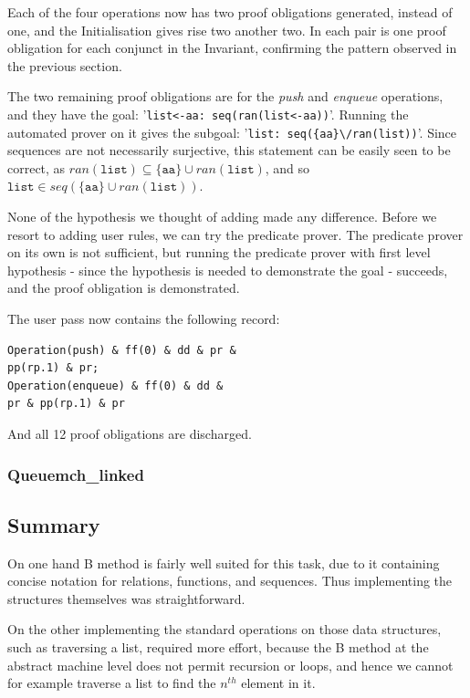 \documentclass[11pt,journal]{IEEEtran}
\begin{document}
	Each of the four operations now has two proof obligations generated, instead of one, and the Initialisation gives rise two another two. In each pair is one proof obligation for each conjunct in the Invariant, confirming the pattern observed in the previous section.
	
	The two remaining proof obligations are for the \textit{push} and \textit{enqueue} operations, and they have the goal: '\texttt{list<-aa: seq(ran(list<-aa))}'. Running the automated prover on it gives the subgoal: '\verb|list: seq({aa}\/ran(list))|'. Since sequences are not necessarily surjective, this statement can be easily seen to be correct, as $ran(\texttt{list}) \subseteq \{\texttt{aa}\} \cup ran(\texttt{list})$, and so $\texttt{list} \in seq(\{\texttt{aa}\} \cup ran(\texttt{list}))$.
	
	None of the hypothesis we thought of adding made any difference. Before we resort to adding user rules, we can try the predicate prover. The predicate prover on its own is not sufficient, but running the predicate prover with first level hypothesis - since the hypothesis is needed to demonstrate the goal - succeeds, and the proof obligation is demonstrated.
	
	The user pass now contains the following record:
	\begin{lstlisting}
Operation(push) & ff(0) & dd & pr & 
pp(rp.1) & pr;
Operation(enqueue) & ff(0) & dd & 
pr & pp(rp.1) & pr
	\end{lstlisting}
	
	And all 12 proof obligations are discharged.
	
	\subsubsection{Queuemch\_linked}
	
	
	
	\subsection{Summary}
	On one hand B method is fairly well suited for this task, due to it containing concise notation for relations, functions, and sequences. Thus implementing the structures themselves was straightforward. 
	
	On the other implementing the standard operations on those data structures, such as traversing a list, required more effort, because the B method at the abstract machine level does not permit recursion or loops, and hence we cannot for example traverse a list to find the $n^{th}$ element in it.
\end{document}
